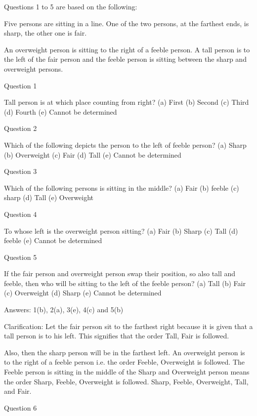 

Questions 1 to 5 are based on the following:

Five persons are sitting in a line. 
One of the two persons, at the farthest ends, is sharp, the other one is fair.

An overweight person is sitting to the right of a feeble person. 
A tall person is to the left of the fair person and the feeble person is sitting between the sharp and overweight persons.

Question 1

Tall person is at which place counting from right?
(a) First
(b) Second
(c) Third
(d) Fourth
(e) Cannot be determined

Question 2

Which of the following depicts the person to the left of feeble person?
(a) Sharp
(b) Overweight
(c) Fair
(d) Tall
(e) Cannot be determined

Question 3

Which of the following persons is sitting in the middle?
(a) Fair
(b) feeble
(c) sharp
(d) Tall
(e) Overweight

Question 4

To whose left is the overweight person sitting?
(a) Fair
(b) Sharp
(c) Tall
(d) feeble
(e) Cannot be determined

Question 5

If the fair person and overweight person swap their position, so also tall and feeble, then who will be sitting to the left of the feeble person?
(a) Tall
(b) Fair
(c) Overweight
(d) Sharp
(e) Cannot be determined

Answers: 1(b), 2(a), 3(e), 4(c) and 5(b)

Clarification: Let the fair person sit to the farthest right because it is given that a tall person is to his left. This signifies that the order Tall, Fair is followed.

Also, then the sharp person will be in the farthest left. An overweight person is to the right of a feeble person i.e. the order Feeble, Overweight is followed. The Feeble person is sitting in the middle of the Sharp and Overweight person means the order Sharp, Feeble, Overweight is followed. Sharp, Feeble, Overweight, Tall, and Fair.




Question 6

